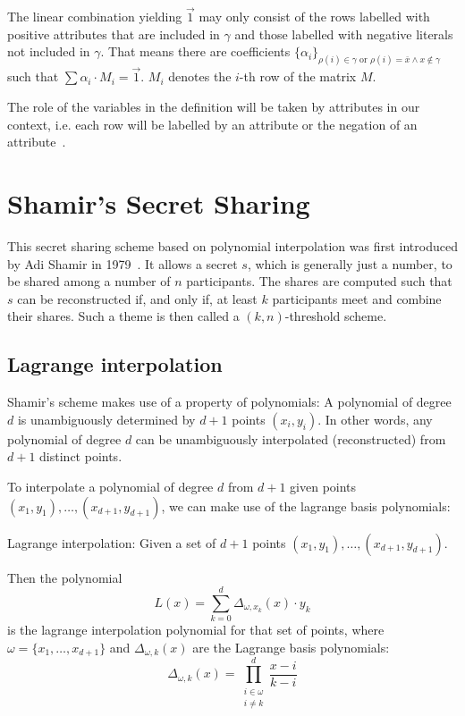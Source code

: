 The linear combination yielding $\vec{1}$ may only consist of the rows labelled with positive attributes that are included in $\gamma$ and those labelled with negative literals not included in $\gamma$.
That means there are coefficients $\{\alpha_i\}_{\rho(i) \in \gamma \text{ or } \rho(i) = \bar{x} \land x \notin \gamma}$ such that $\sum \alpha_i \cdot M_i = \vec{1}$.
$M_i$ denotes the $i$-th row of the matrix $M$.

The role of the variables in the definition will be taken by attributes in our context, i.e. each row will be labelled by an attribute or the negation of an attribute~\cite{goyal_attribute-based_2006}.

\section{Shamir's Secret Sharing}
This secret sharing scheme based on polynomial interpolation was first introduced by Adi Shamir in 1979~\cite{shamir_how_1979}.
It allows a secret $s$, which is generally just a number, to be shared among a number of $n$ participants.
The shares are computed such that $s$ can be reconstructed if, and only if, at least $k$ participants meet and combine their shares.
Such a theme is then called a $(k,n)$-threshold scheme.~\cite{shamir_how_1979}

\subsection{Lagrange interpolation}
Shamir's scheme makes use of a property of polynomials: A polynomial of degree $d$ is unambiguously determined by $d+1$ points $(x_i, y_i)$.
In other words, any polynomial of degree $d$ can be unambiguously interpolated (reconstructed) from $d+1$ distinct points.

To interpolate a polynomial of degree $d$ from $d+1$ given points $(x_1, y_1), \dots, (x_{d+1}, y_{d+1})$, we can make use of the lagrange basis polynomials:~\cite{yao_lightweight_2015}

\begin{definition}
    Lagrange interpolation: Given a set of $d+1$ points $(x_1, y_1), \dots, (x_{d+1}, y_{d+1})$.

    Then the polynomial 
    \begin{equation}
        L(x) = \sum_{k=0}^d \Delta_{\omega, x_k}(x) \cdot y_k
    \end{equation}
    is the lagrange interpolation polynomial for that set of points, where $\omega = \{x_1, \dots, x_{d+1}\}$ and $\Delta_{\omega,k}(x)$ are the Lagrange basis polynomials:
    \begin{equation}
        \Delta_{\omega,k}(x) = \prod_{\substack{i\in\omega\\ i \neq k}}^d \frac{x-i}{k-i}
    \end{equation}
\end{definition}

